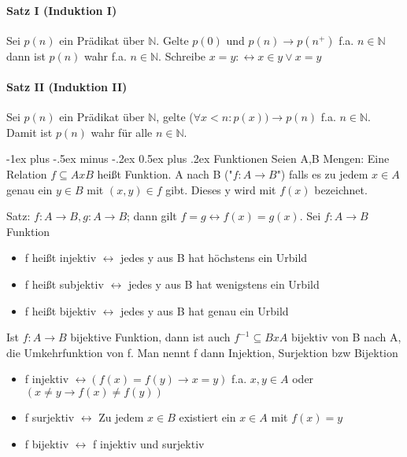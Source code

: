 \documentclass[a4paper]{article}
\makeatletter
\renewcommand{\section}{\@startsection{section}{1}{0mm}%
                                {-1ex plus -.5ex minus -.2ex}%
                                {0.5ex plus .2ex}%
                                {\normalfont\large\bfseries}}
\makeatother
\begin{document}
\begin{multicols}{3}
    \paragraph{Satz I (Induktion I)}
    Sei $p(n)$ ein Prädikat über $\mathbb{N}$. Gelte $p(0)$ und $p(n)\rightarrow p(n^{+})$ f.a. $n\in \mathbb{N}$ dann ist $p(n)$ wahr f.a. $n \in \mathbb{N}$. Schreibe $x=y:\leftrightarrow x\in y \vee x=y$
    
    \paragraph{Satz II (Induktion II)}
    Sei $p(n)$ ein Prädikat über $\mathbb{N}$, gelte ($\forall x < n: p(x)) \rightarrow p(n)$ f.a. $n\in \mathbb{N}$. Damit ist $p(n)$ wahr für alle $n\in \mathbb{N}$.
    
    \section{Funktionen}
    Seien A,B Mengen: Eine Relation $f\subseteq A x B$ heißt Funktion. A nach B ("$f:A\rightarrow B$") falls es zu jedem $x\in A$ genau ein $y\in B$ mit $(x,y)\in f$ gibt. Dieses y wird mit $f(x)$ bezeichnet.
    
    Satz: $f:A\rightarrow B, g:A\rightarrow B$; dann gilt $f=g \leftrightarrow f(x)=g(x)$. Sei $f:A\rightarrow B$ Funktion
    \begin{itemize}
        \item f heißt injektiv $\leftrightarrow$ jedes y aus B hat höchstens ein Urbild
        \item f heißt subjektiv $\leftrightarrow$ jedes y aus B hat wenigstens ein Urbild
        \item f heißt bijektiv $\leftrightarrow$ jedes y aus B hat genau ein Urbild
    \end{itemize}
    
    Ist $f:A\rightarrow B$ bijektive Funktion, dann ist auch $f^{-1}\subseteq BxA$ bijektiv von B nach A, die Umkehrfunktion von f.
    Man nennt f dann Injektion, Surjektion bzw Bijektion
    \begin{itemize}
        \item f injektiv $\leftrightarrow (f(x)=f(y)\rightarrow x=y)$ f.a. $x,y\in A$ oder $(x\not = y \rightarrow f(x)\not = f(y))$
        \item f surjektiv $\leftrightarrow$ Zu jedem $x\in B$ existiert ein $x\in A$ mit $f(x)=y$
        \item f bijektiv $\leftrightarrow$ f injektiv und surjektiv
    \end{itemize}
    

\end{multicols}
\end{document}
